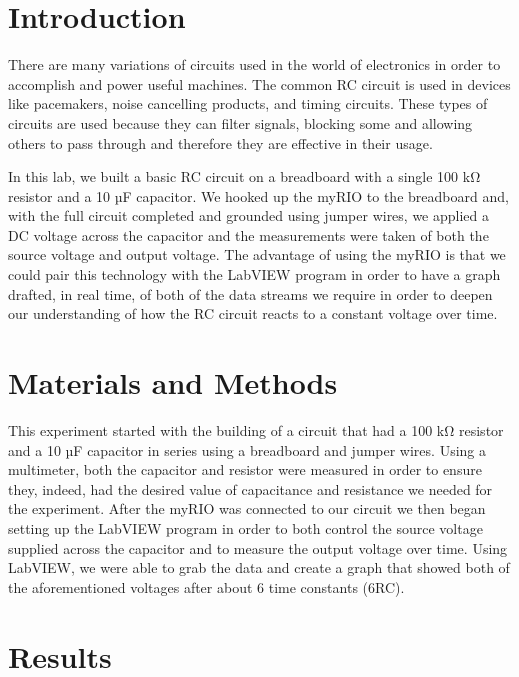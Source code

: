 \documentclass[10pt,twocolumn]{article}
\begin{document}

\section{Introduction} 
\label{sec:introduction}

There are many variations of circuits used in the world of electronics in order to accomplish and power useful machines. The common RC circuit is used in devices like pacemakers, noise cancelling products, and timing circuits. These types of circuits are used because they can filter signals, blocking some and allowing others to pass through and therefore they are effective in their usage. 

In this lab, we built a basic RC circuit on a breadboard with a single 100 kΩ resistor and a 10 µF capacitor. We hooked up the myRIO to the breadboard and, with the full circuit completed and grounded using jumper wires, we applied a DC voltage across the capacitor and the measurements were taken of both the source voltage and output voltage.  The advantage of using the myRIO is that we could pair this technology with the LabVIEW program in order to have a graph drafted, in real time, of both of the data streams we require in order to deepen our understanding of how the RC circuit reacts to a constant voltage over time. 



\section{Materials and Methods}

This experiment started with the building of a circuit that had a 100 kΩ resistor and a 10 µF capacitor in series using a breadboard and jumper wires. Using a multimeter, both the capacitor and resistor were measured in order to ensure they, indeed, had the desired value of capacitance and resistance we needed for the experiment. After the myRIO was connected to our circuit we then began setting up the LabVIEW program in order to both control the source voltage supplied across the capacitor and to measure the output voltage over time. Using LabVIEW, we were able to grab the data and create a graph that showed both of the aforementioned voltages after about 6 time constants (6RC).
\section{Results}
\label{sec:results}
\end{document}
